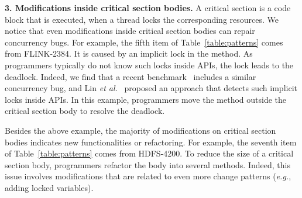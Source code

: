 \noindent
\textbf{3. Modifications inside critical section bodies.} A critical section is a code block that is executed, when a thread locks the corresponding resources. We notice that even modifications inside critical section bodies can repair concurrency bugs. For example, the fifth item of Table~\ref{table:patterns} comes from FLINK-2384. It is caused by an implicit lock in the  method. As programmers typically do not know such locks inside APIs, the lock leads to the deadlock. Indeed, we find that a recent benchmark~\cite{lin2015ase} includes a similar concurrency bug, and Lin \emph{et al.}~\cite{lin2016lockpeeker} proposed an approach that detects such implicit locks inside APIs. In this example, programmers move the  method outside the critical section body to resolve the deadlock.

%
%
%


Besides the above example, the majority of modifications on critical section bodies indicates new functionalities or refactoring. For example, the seventh item of Table~\ref{table:patterns} comes from HDFS-4200. To reduce the size of a critical section body, programmers refactor the body into several methods. Indeed, this issue involves modifications that are related to even more change patterns (\emph{e.g.}, adding locked variables).


